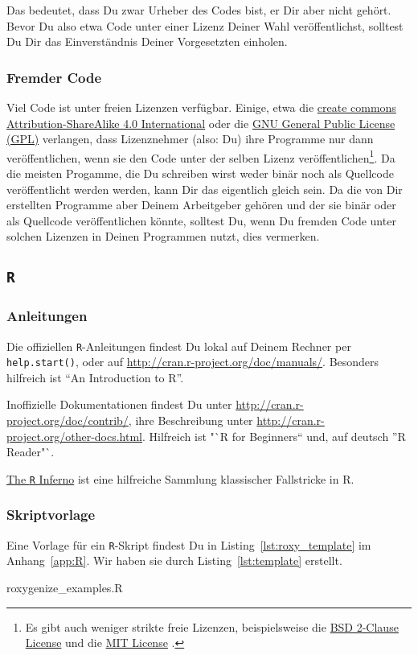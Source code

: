\documentclass[twoside]{scrartcl}
\providecommand{\R}{\texttt{R}}
\providecommand{\code}[1]{\texttt{#1}}
\begin{document}
Das bedeutet, dass Du zwar Urheber des Codes bist, er Dir aber nicht
geh\"o{}rt. Bevor Du also etwa Code unter einer Lizenz Deiner Wahl
ver\"o{}ffentlichst, solltest Du Dir das Einverst\"a{}ndnis Deiner Vorgesetzten 
einholen.

\subsubsection{Fremder Code\label{sec:copy_foreign}}
Viel Code ist unter freien Lizenzen verf\"u{}gbar. Einige, etwa die
\href{https://creativecommons.org/licenses/by-sa/4.0/legalcode}{create commons
Attribution-ShareAlike 4.0 International} oder die
\href{http://www.gnu.org/licenses/gpl-3.0.html}{GNU General Public License
(GPL)} verlangen, dass Lizenznehmer (also: Du) ihre Programme nur dann
ver\"o{}ffentlichen, wenn sie den Code unter der selben Lizenz
ver\"o{}ffentlichen\footnote{Es gibt auch weniger strikte freie Lizenzen,
beispielsweise die 
\href{http://opensource.org/licenses/BSD-2-Clause}{BSD 2-Clause License} und
die 
\href{http://opensource.org/licenses/MIT}{MIT License}%
. }.
Da die meisten Progamme, die Du schreiben wirst weder bin\"a{}r noch als
Quellcode ver\"o{}ffentlicht werden werden, kann Dir das eigentlich gleich sein.
Da die von Dir erstellten Programme aber Deinem Arbeitgeber geh\"o{}ren und der
sie bin\"a{}r oder als Quellcode ver\"o{}ffentlichen k\"o{}nnte, solltest Du,
wenn Du fremden Code unter solchen Lizenzen in Deinen Programmen nutzt, dies
vermerken.
\subsection{\R{}}
\subsubsection{Anleitungen}
Die offiziellen  \R{}-Anleitungen findest Du lokal auf Deinem Rechner per 
\code{help.start()}, oder auf \url{http://cran.r-project.org/doc/manuals/}.
Besonders hilfreich ist "`An Introduction to R"'.

Inoffizielle Dokumentationen findest Du unter 
\url{http://cran.r-project.org/doc/contrib/}, ihre Beschreibung unter 
\url{http://cran.r-project.org/other-docs.html}. Hilfreich ist 
"`R for Beginners"` und, auf deutsch "'R Reader"`.

\href{www.burns-stat.com/pages/Tutor/R_inferno.pdf}{The \R{} Inferno} ist eine
hilfreiche Sammlung klassischer Fallstricke in R. 
\subsubsection{Skriptvorlage}
Eine Vorlage f\"ur ein \R{}-Skript findest Du in Listing~\ref{lst:roxy_template}
im Anhang~\ref{app:R}. Wir haben sie durch Listing~\ref{lst:template} erstellt.

{roxygenize_examples.R}
\end{document}
